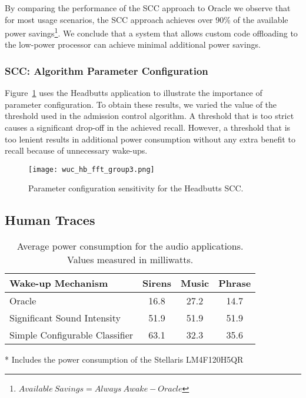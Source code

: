 By comparing the performance of the SCC approach to Oracle we
observe that for most usage scenarios, the SCC approach
achieves over 90\% of the available power
savings\footnote{$Available\:Savings=Always\:Awake - Oracle$}.
We conclude that a system that allows
custom code offloading to the low-power processor can achieve minimal
additional power savings.


\subsubsection{SCC: Algorithm Parameter Configuration}

Figure~\ref{fig:wucHeadbuttFFTRecallPowerGroup3} uses the Headbutts
application to illustrate the importance of parameter configuration.  
To obtain these results, we varied the value of the threshold used
in the admission control algorithm.  A threshold that is too strict 
causes a significant drop-off in the
achieved recall.  However, a threshold that is too lenient results in
additional power consumption without any extra benefit to recall
because of unnecessary wake-ups.


\begin{figure}[h]
	\texttt{[image: wuc\_hb\_fft\_group3.png]}
	\caption{Parameter configuration sensitivity for the Headbutts SCC.}
    \label{fig:wucHeadbuttFFTRecallPowerGroup3}
\end{figure}


\subsection{Human Traces}

\bgroup
\def\arraystretch{1.5}
\begin{table}[t]
\begin{threeparttable}
\centering
{\small
	\begin{tabular}{|l|c|c|c|}
	\hline
	\textbf{Wake-up Mechanism}     & \textbf{Sirens}   & \textbf{Music}   & \textbf{Phrase} \\ \hline
	Oracle                         & 16.8              & 27.2             & 14.7            \\ \hline
	Significant Sound Intensity    & 51.9              & 51.9             & 51.9            \\ \hline
	Simple Configurable Classifier & 63.1\tnote{*}    & 32.3             & 35.6            \\ \hline         
	\end{tabular}
	\begin{tablenotes}
		\item{*} Includes the power consumption of the Stellaris LM4F120H5QR
	\end{tablenotes}
}
\caption{Average power consumption for the audio applications.  Values measured in milliwatts.}
\label{table:macrobenchmarksAudio}
\end{threeparttable}
\end{table}
\egroup

